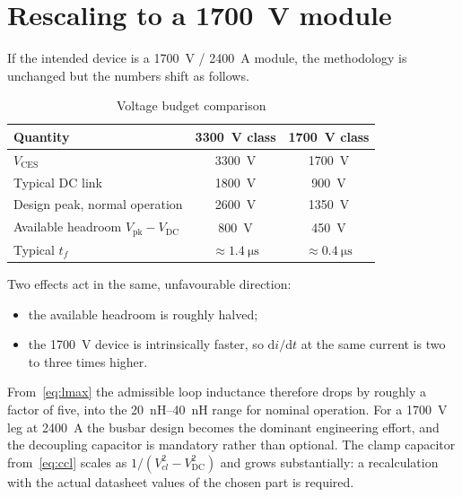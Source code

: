 \documentclass[11pt,a4paper]{article}
\newcommand{\Vces}{V_{\mathrm{CES}}}
\newcommand{\Vdc}{V_{\mathrm{DC}}}
\newcommand{\Vpk}{V_{\mathrm{pk}}}
\begin{document}
\section{Rescaling to a \SI{1700}{\volt} module}
\label{sec:rescale}

If the intended device is a \SI{1700}{\volt} / \SI{2400}{\ampere} module, the
methodology is unchanged but the numbers shift as follows.

\begin{table}[htbp]
\centering
\caption{Voltage budget comparison}
\label{tab:rescale}
\begin{tabular}{lcc}
\toprule
Quantity & \SI{3300}{\volt} class & \SI{1700}{\volt} class \\
\midrule
$\Vces$                             & \SI{3300}{\volt} & \SI{1700}{\volt} \\
Typical DC link                     & \SI{1800}{\volt} & \SI{900}{\volt} \\
Design peak, normal operation       & \SI{2600}{\volt} & \SI{1350}{\volt} \\
Available headroom $\Vpk - \Vdc$   & \SI{800}{\volt}  & \SI{450}{\volt} \\
Typical $t_f$                       & $\approx\SI{1.4}{\micro\second}$ & $\approx\SI{0.4}{\micro\second}$ \\
\bottomrule
\end{tabular}
\end{table}

Two effects act in the same, unfavourable direction:
\begin{itemize}[nosep]
\item the available headroom is roughly halved;
\item the \SI{1700}{\volt} device is intrinsically faster, so
      $\mathrm{d}i/\mathrm{d}t$ at the same current is two to three times
      higher.
\end{itemize}
From~\eqref{eq:lmax} the admissible loop inductance therefore drops by roughly
a factor of five, into the \SIrange{20}{40}{\nano\henry} range for nominal
operation. For a \SI{1700}{\volt} leg at \SI{2400}{\ampere} the busbar design
becomes the dominant engineering effort, and the decoupling capacitor is
mandatory rather than optional. The clamp capacitor
from~\eqref{eq:ccl} scales as $1/(V_{cl}^{2}-\Vdc^{2})$ and grows
substantially: a recalculation with the actual datasheet values of the chosen
part is required.
\end{document}
